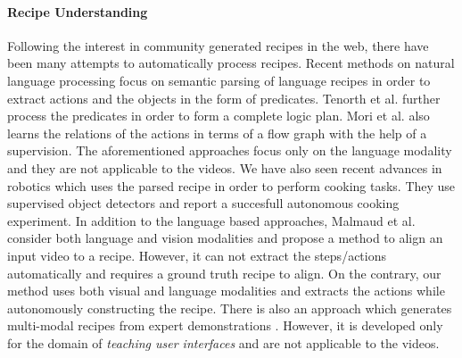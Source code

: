 \paragraph{Recipe Understanding}
Following the interest in community generated recipes in the web, there have been many attempts to automatically process recipes. Recent methods on natural language processing \cite{cookingSemantics,logicRecipe} focus on semantic parsing of language recipes in order to extract actions and the objects in the form of predicates. Tenorth et al.\cite{logicRecipe} further process the predicates in order to form a complete logic plan. Mori et al.\cite{flowGraph} also learns the relations of the actions in terms of a flow graph with the help of a supervision. The aforementioned approaches focus only on the language modality and they are not applicable to the videos. We have also seen recent advances \cite{beetz,cookie} in robotics which uses the parsed recipe in order to perform cooking tasks. They use supervised object detectors and report a succesfull autonomous cooking experiment. In addition to the language based approaches, Malmaud et al.\cite{alignment} consider both language and vision modalities and propose a method to align an input video to a recipe. However, it can not extract the steps/actions automatically and requires a ground truth recipe to align. On the contrary, our method uses both visual and language modalities and extracts the actions while autonomously constructing the recipe. There is also an approach which generates multi-modal recipes from expert demonstrations \cite{photoshop}. However, it is developed only for the domain of \emph{teaching user interfaces} and are not applicable to the videos.
